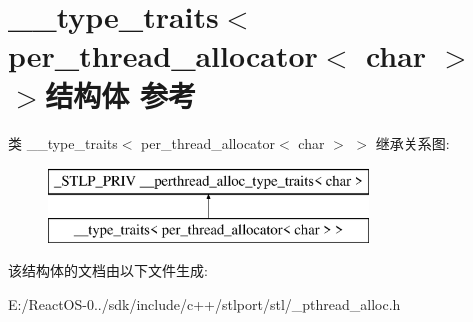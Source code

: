 \hypertarget{struct____type__traits_3_01per__thread__allocator_3_01char_01_4_01_4}{}\section{\+\_\+\+\_\+type\+\_\+traits$<$ per\+\_\+thread\+\_\+allocator$<$ char $>$ $>$结构体 参考}
\label{struct____type__traits_3_01per__thread__allocator_3_01char_01_4_01_4}
类 \+\_\+\+\_\+type\+\_\+traits$<$ per\+\_\+thread\+\_\+allocator$<$ char $>$ $>$ 继承关系图\+:\begin{figure}[H]
\begin{center}
\leavevmode
\includegraphics[height=2.000000cm]{struct____type__traits_3_01per__thread__allocator_3_01char_01_4_01_4}
\end{center}
\end{figure}


该结构体的文档由以下文件生成\+:\begin{DoxyCompactItemize}
\item 
E\+:/\+React\+O\+S-\/0../sdk/include/c++/stlport/stl/\+\_\+pthread\+\_\+alloc.\+h\end{DoxyCompactItemize}
